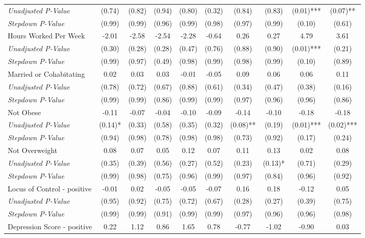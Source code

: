 \begin{tabular}{l c c c c c c c c c}
\quad \textit{Unadjusted P-Value} & (0.74) & (0.82) & (0.94) & (0.80) & (0.32) & (0.84) & (0.83) & (0.01)*** & (0.07)** \\
\quad \textit{Stepdown P-Value} & (0.99) & (0.99) & (0.96) & (0.99) & (0.98) & (0.97) & (0.99) & (0.10) & (0.61) \\
Hours Worked Per Week & -2.01 & -2.58 & -2.54 & -2.28 & -0.64 & 0.26 & 0.27 & 4.79 & 3.61 \\
\quad \textit{Unadjusted P-Value} & (0.30) & (0.28) & (0.28) & (0.47) & (0.76) & (0.88) & (0.90) & (0.01)*** & (0.21) \\
\quad \textit{Stepdown P-Value} & (0.99) & (0.97) & (0.49) & (0.98) & (0.99) & (0.98) & (0.99) & (0.10) & (0.89) \\
Married or Cohabitating & 0.02 & 0.03 & 0.03 & -0.01 & -0.05 & 0.09 & 0.06 & 0.06 & 0.11 \\
\quad \textit{Unadjusted P-Value} & (0.78) & (0.72) & (0.67) & (0.88) & (0.61) & (0.34) & (0.47) & (0.38) & (0.16) \\
\quad \textit{Stepdown P-Value} & (0.99) & (0.99) & (0.86) & (0.99) & (0.99) & (0.97) & (0.96) & (0.96) & (0.86) \\
Not Obese & -0.11 & -0.07 & -0.04 & -0.10 & -0.09 & -0.14 & -0.10 & -0.18 & -0.18 \\
\quad \textit{Unadjusted P-Value} & (0.14)* & (0.33) & (0.58) & (0.35) & (0.32) & (0.08)** & (0.19) & (0.01)*** & (0.02)*** \\
\quad \textit{Stepdown P-Value} & (0.94) & (0.98) & (0.78) & (0.98) & (0.98) & (0.73) & (0.92) & (0.17) & (0.24) \\
Not Overweight & 0.08 & 0.07 & 0.05 & 0.12 & 0.07 & 0.11 & 0.13 & 0.02 & 0.08 \\
\quad \textit{Unadjusted P-Value} & (0.35) & (0.39) & (0.56) & (0.27) & (0.52) & (0.23) & (0.13)* & (0.71) & (0.29) \\
\quad \textit{Stepdown P-Value} & (0.99) & (0.98) & (0.75) & (0.96) & (0.99) & (0.97) & (0.84) & (0.96) & (0.92) \\
Locus of Control - positive & -0.01 & 0.02 & -0.05 & -0.05 & -0.07 & 0.16 & 0.18 & -0.12 & 0.05 \\
\quad \textit{Unadjusted P-Value} & (0.95) & (0.92) & (0.75) & (0.72) & (0.67) & (0.28) & (0.27) & (0.39) & (0.75) \\
\quad \textit{Stepdown P-Value} & (0.99) & (0.99) & (0.91) & (0.99) & (0.99) & (0.97) & (0.96) & (0.96) & (0.98) \\
Depression Score - positive & 0.22 & 1.12 & 0.86 & 1.65 & 0.78 & -0.77 & -1.02 & -0.90 & 0.03 \\

\end{tabular}
